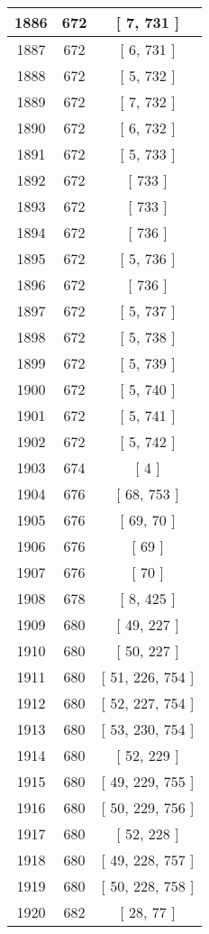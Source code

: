\begin{center}
\begin{longtable}[H]{|| c c c ||}
1886 & 672 & [ 7, 731 ] \\ 
\hline
1887 & 672 & [ 6, 731 ] \\ 
\hline
1888 & 672 & [ 5, 732 ] \\ 
\hline
1889 & 672 & [ 7, 732 ] \\ 
\hline
1890 & 672 & [ 6, 732 ] \\ 
\hline
1891 & 672 & [ 5, 733 ] \\ 
\hline
1892 & 672 & [ 733 ] \\ 
\hline
1893 & 672 & [ 733 ] \\ 
\hline
1894 & 672 & [ 736 ] \\ 
\hline
1895 & 672 & [ 5, 736 ] \\ 
\hline
1896 & 672 & [ 736 ] \\ 
\hline
1897 & 672 & [ 5, 737 ] \\ 
\hline
1898 & 672 & [ 5, 738 ] \\ 
\hline
1899 & 672 & [ 5, 739 ] \\ 
\hline
1900 & 672 & [ 5, 740 ] \\ 
\hline
1901 & 672 & [ 5, 741 ] \\ 
\hline
1902 & 672 & [ 5, 742 ] \\ 
\hline
1903 & 674 & [ 4 ] \\ 
\hline
1904 & 676 & [ 68, 753 ] \\ 
\hline
1905 & 676 & [ 69, 70 ] \\ 
\hline
1906 & 676 & [ 69 ] \\ 
\hline
1907 & 676 & [ 70 ] \\ 
\hline
1908 & 678 & [ 8, 425 ] \\ 
\hline
1909 & 680 & [ 49, 227 ] \\ 
\hline
1910 & 680 & [ 50, 227 ] \\ 
\hline
1911 & 680 & [ 51, 226, 754 ] \\ 
\hline
1912 & 680 & [ 52, 227, 754 ] \\ 
\hline
1913 & 680 & [ 53, 230, 754 ] \\ 
\hline
1914 & 680 & [ 52, 229 ] \\ 
\hline
1915 & 680 & [ 49, 229, 755 ] \\ 
\hline
1916 & 680 & [ 50, 229, 756 ] \\ 
\hline
1917 & 680 & [ 52, 228 ] \\ 
\hline
1918 & 680 & [ 49, 228, 757 ] \\ 
\hline
1919 & 680 & [ 50, 228, 758 ] \\ 
\hline
1920 & 682 & [ 28, 77 ] \\ 

\end{longtable}
\end{center}
